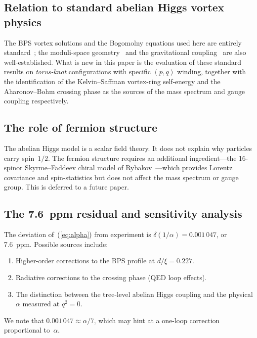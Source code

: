 \documentclass[11pt]{article}
\begin{document}
\subsection{Relation to standard abelian Higgs vortex physics}

The BPS vortex solutions and the Bogomolny equations used here are
entirely standard~\cite{Bogomolny1976}; the moduli-space
geometry~\cite{Samols1992} and the gravitational
coupling~\cite{Garfinkle1985,ComtetGibbons1988} are also
well-established.  What is new in this paper is the evaluation of
these standard results on \emph{torus-knot} configurations with
specific $(p,q)$ winding, together with the identification of
the Kelvin--Saffman vortex-ring self-energy and the
Aharonov--Bohm crossing phase as the sources of the mass spectrum
and gauge coupling respectively.

\subsection{The role of fermion structure}

The abelian Higgs model is a scalar field theory.  It does not explain
why particles carry spin~$1/2$.  The fermion structure requires an
additional ingredient---the 16-spinor Skyrme--Faddeev chiral model
of Rybakov~\cite{Rybakov2016,Rybakov2024}---which provides Lorentz
covariance and spin-statistics but does not affect the mass spectrum
or gauge group.  This is deferred to a future paper.

\subsection{The 7.6~ppm residual and sensitivity analysis}

The deviation of~(\ref{eq:alpha}) from experiment is $\delta(1/\alpha)
= 0.001\,047$, or 7.6~ppm.  Possible sources include:
\begin{enumerate}
\item Higher-order corrections to the BPS profile at $d/\xi = 0.227$.
\item Radiative corrections to the crossing phase (QED loop effects).
\item The distinction between the tree-level abelian Higgs coupling
      and the physical $\alpha$ measured at $q^2 = 0$.
\end{enumerate}
We note that $0.001\,047 \approx \alpha/7$, which may hint at a
one-loop correction proportional to~$\alpha$.
\end{document}
